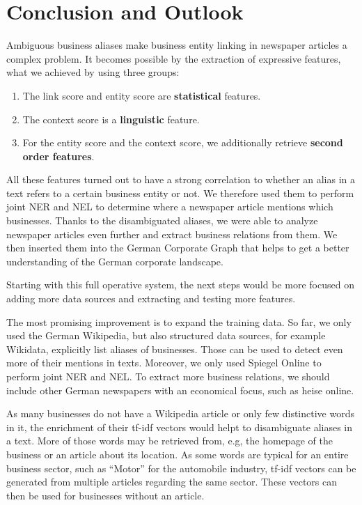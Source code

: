 \section{Conclusion and Outlook}
\label{sec:conclusion}
Ambiguous business aliases make business entity linking in newspaper articles a complex problem. It becomes possible by the extraction of expressive features, what we achieved by using three groups:

\begin{enumerate}
\item The link score and entity score are \textbf{statistical} features.
\item The context score is a \textbf{linguistic} feature.
\item For the entity score and the context score, we additionally retrieve \textbf{second order features}.
\end {enumerate}

All these features turned out to have a strong correlation to whether an alias in a text refers to a certain business entity or not. We therefore used them to perform joint NER and NEL to determine where a newspaper article mentions which businesses. Thanks to the disambiguated aliases, we were able to analyze newspaper articles even further and extract business relations from them. We then inserted them into the German Corporate Graph that helps to get a better understanding of the German corporate landscape.

Starting with this full operative system, the next steps would be more focused on adding more data sources and extracting and testing more features.

The most promising improvement is to expand the training data. So far, we only used the German Wikipedia, but also structured data sources, for example Wikidata, explicitly list aliases of businesses. Those can be used to detect even more of their mentions in texts. Moreover, we only used Spiegel Online to perform joint NER and NEL. To extract more business relations, we should include other German newspapers with an economical focus, such as heise online\footnotemark{}.

As many businesses do not have a Wikipedia article or only few distinctive words in it, the enrichment of their tf-idf vectors would helpt to disambiguate aliases in a text. More of those words may be retrieved from, e.g, the homepage of the business or an article about its location. As some words are typical for an entire business sector, such as "`Motor"' for the automobile industry, tf-idf vectors can be generated from multiple articles regarding the same sector. These vectors can then be used for businesses without an article.

